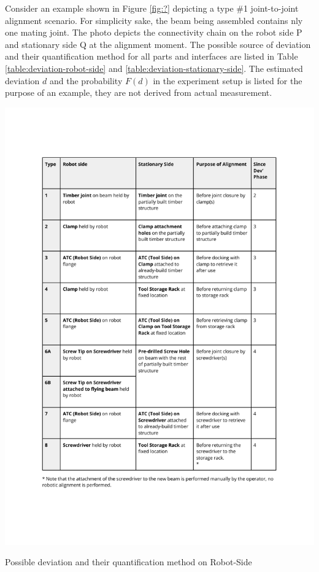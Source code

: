 \FloatBarrier



Consider an example shown in Figure \ref{fig:?} depicting a type \#1 joint-to-joint alignment scenario. For simplicity sake, the beam being assembled contains nly one mating joint. The photo depicts the connectivity chain on the robot side P and stationary side Q at the alignment moment. The possible source of deviation and their quantification method for all parts and interfaces are listed in Table \ref{table:deviation-robot-side} and \ref{table:deviation-stationary-side}. The estimated deviation $d$ and the probability $F(d)$ in the experiment setup is listed for the purpose of an example, they are not derived from actual measurement.


\begin{table}
    \includegraphics[page=3, trim=25.4mm 30mm 25.4mm 33mm, clip, width=\textwidth]{tables/Tables in Chapter 9 to 11.pdf}
    \caption{Possible deviation and their quantification method on Robot-Side}
    \label{table:deviation-robot-side}
\end{table}

